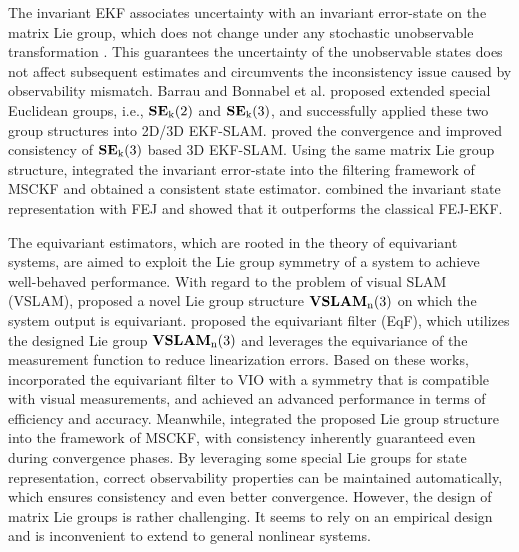 The invariant EKF associates uncertainty with an invariant error-state on the matrix Lie group, which does not change under any stochastic unobservable transformation \cite{B31,B44}. This guarantees the uncertainty of the unobservable states does not affect subsequent estimates and circumvents the inconsistency issue caused by observability mismatch. Barrau and Bonnabel et al. \cite{B45, B47} proposed extended special Euclidean groups, i.e., $\rm \mathbf{SE}_{k}(2)$ and $\rm \mathbf{SE}_{k}(3)$, and successfully applied these two group structures into 2D/3D EKF-SLAM. \cite{B31} proved the convergence and improved consistency of $\rm \mathbf{SE}_{k}(3)$ based 3D EKF-SLAM. Using the same matrix Lie group structure, \cite{B32} integrated the invariant error-state into the filtering framework of MSCKF and obtained a consistent state estimator. \cite{B33} combined the invariant state representation with FEJ and showed that it outperforms the classical FEJ-EKF.

The equivariant estimators, which are rooted in the theory of equivariant systems, are aimed to exploit the Lie group symmetry of a system to achieve well-behaved performance. With regard to the problem of visual SLAM (VSLAM), \cite{B51} proposed a novel Lie group structure $\rm \mathbf{VSLAM}_n(3)$ on which the system output is equivariant. \cite{B49} proposed the equivariant filter (EqF), which utilizes the designed Lie group $\rm \mathbf{VSLAM}_n(3)$ and leverages the equivariance of the measurement function to reduce linearization errors. Based on these works, \cite{B50} incorporated the equivariant filter to VIO with a symmetry that is compatible with visual measurements, and achieved an advanced performance in terms of efficiency and accuracy. Meanwhile, \cite{B77} integrated the proposed Lie group structure into the framework of MSCKF, with consistency inherently guaranteed even during convergence phases. By leveraging some special Lie groups for state representation, correct observability properties can be maintained automatically, which ensures consistency and even better convergence. However, the design of matrix Lie groups is rather challenging. It seems to rely on an empirical design and is inconvenient to extend to general nonlinear systems. 


